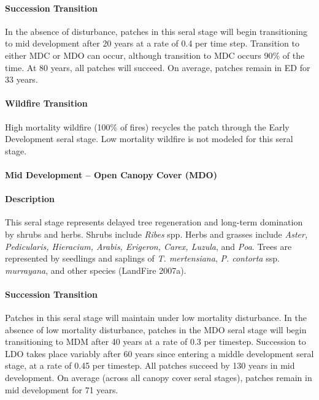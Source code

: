 \paragraph{Succession Transition} In the absence of disturbance, patches in this seral stage will begin transitioning to mid development after 20 years at a rate of 0.4 per time step. Transition to either MDC or MDO can occur, although transition to MDC occurs 90\% of the time. At 80 years, all patches will succeed. On average, patches remain in ED for 33 years.

\paragraph{Wildfire Transition} High mortality wildfire (100\% of fires) recycles the patch through the Early Development seral stage. Low mortality wildfire is not modeled for this seral stage.

\noindent\hrulefill


\paragraph{Mid Development – Open Canopy Cover (MDO)} 

\paragraph{Description} This seral stage represents delayed tree regeneration and long-term domination by shrubs and herbs. Shrubs include \emph{Ribes} spp. Herbs and grasses include \emph{Aster, Pedicularis, Hieracium, Arabis, Erigeron, Carex, Luzula}, and \emph{Poa}. Trees are represented by seedlings and saplings of \emph{T. mertensiana}, \emph{P. contorta} ssp. \emph{murrayana}, and other species (LandFire 2007a).

\paragraph{Succession Transition} Patches in this seral stage will maintain under low mortality disturbance. In the absence of low mortality disturbance, patches in the MDO seral stage will begin transitioning to MDM after 40 years at a rate of 0.3 per timestep. Succession to LDO takes place variably after 60 years since entering a middle development seral stage, at a rate of 0.45 per timestep. All patches succeed by 130 years in mid development.  On average (across all canopy cover seral stages), patches remain in mid development for 71 years.

